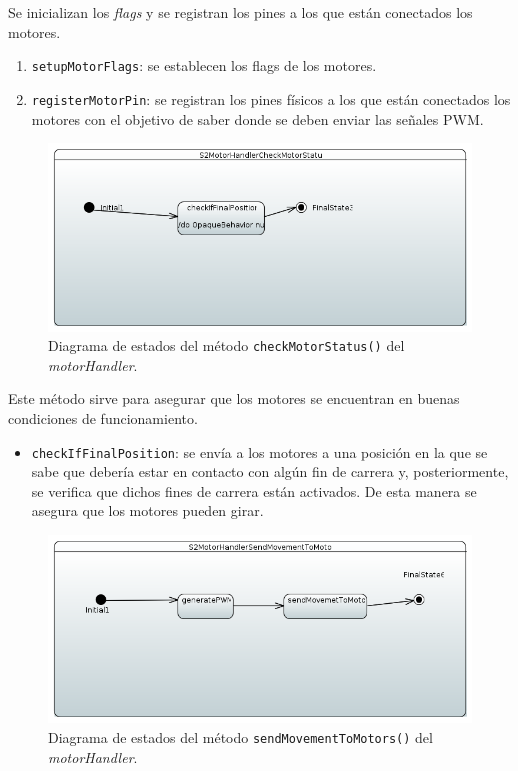 Se inicializan los \textit{flags} y se registran los pines a los que están conectados los motores.

\begin{enumerate}
    \item \texttt{setupMotorFlags}: se establecen los flags de los motores.
    \item \texttt{registerMotorPin}: se registran los pines físicos a los que están conectados los motores con el objetivo de saber donde se deben enviar las señales \ac{PWM}.
\end{enumerate}

\begin{figure}[H]
    \centering
    \includegraphics[width=1\linewidth]{pictures/S2MotorHandlerCheckMotorStatus.PNG}
    \caption{Diagrama de estados del método \texttt{checkMotorStatus()} del \textit{motorHandler}.}
    \label{fig:fun_check_motor_status_motor_handler}
\end{figure}

Este método sirve para asegurar que los motores se encuentran en buenas condiciones de funcionamiento.

\begin{itemize}
    \item \texttt{checkIfFinalPosition}: se envía a los motores a una posición en la que se sabe que debería estar en contacto con algún fin de carrera y, posteriormente, se verifica que dichos fines de carrera están activados. De esta manera se asegura que los motores pueden girar.
\end{itemize}

\begin{figure}[H]
    \centering
    \includegraphics[width=1\linewidth]{pictures/S2MotorHandlerSendMovementToMotors.PNG}
    \caption{Diagrama de estados del método \texttt{sendMovementToMotors()} del \textit{motorHandler}.}
    \label{fig:fun_send_movement_to_motors_motor_handler}
\end{figure}

